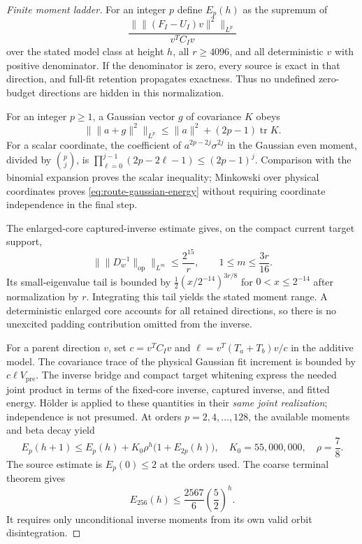 \documentclass[11pt,oneside,openany,a4paper]{report}
\numberwithin{equation}{chapter}
\theoremstyle{definition}
\theoremstyle{remark}
\DeclareMathOperator{\tr}{tr}\DeclareMathOperator{\rank}{rank}
\begin{document}
\begin{proof}[Finite moment ladder]
For an integer $p$ define $E_p(h)$ as the supremum of
\[
 \frac{\|\lVert(F_I-U_I)v\rVert^2\|_{L^p}}{v^TC_Iv}
\]
over the stated model class at height $h$, all $r\geq4096$, and all
deterministic $v$ with positive denominator.  If the denominator is
zero, every source is exact in that direction, and full-fit retention
propagates exactness.  Thus no undefined zero-budget directions are
hidden in this normalization.

For an integer $p\geq1$, a Gaussian vector $g$ of covariance $K$ obeys
\begin{equation}
 \|\lVert a+g\rVert^2\|_{L^p}
 \leq\lVert a\rVert^2+(2p-1)\tr K.
 \label{eq:route-gaussian-energy}
\end{equation}
For a scalar coordinate, the coefficient of
$a^{2p-2j}\sigma^{2j}$ in the Gaussian even moment, divided by
$\binom pj$, is
$\prod_{\ell=0}^{j-1}(2p-2\ell-1)\leq(2p-1)^j$.
Comparison with the binomial expansion proves the scalar inequality;
Minkowski over physical coordinates proves
\eqref{eq:route-gaussian-energy} without requiring coordinate
independence in the final step.

The enlarged-core captured-inverse estimate gives, on the compact
current target support,
\[
 \bigl\|\lVert D_w^{-1}\rVert_{\mathrm{op}}\bigr\|_{L^m}
 \leq\frac{2^{15}}r,
 \qquad1\leq m\leq\frac{3r}{16}.
\]
Its small-eigenvalue tail is bounded by
$\tfrac12(x/2^{-14})^{3r/8}$ for $0<x\leq2^{-14}$ after normalization
by $r$.  Integrating this tail yields the stated moment range.  A
deterministic enlarged core accounts for all retained directions, so
there is no unexcited padding contribution omitted from the inverse.

For a parent direction $v$, set $c=v^TC_Iv$ and
$\ell=v^T(T_a+T_b)v/c$ in the additive model.  The covariance trace of
the physical Gaussian fit increment is bounded by
$c\ell V_{\mathrm{pre}}$.  The inverse bridge and compact target
whitening express the needed joint product in terms of the fixed-core
inverse, captured inverse, and fitted energy.  Hölder is applied to
these quantities in their \emph{same joint realization}; independence
is not presumed.  At orders $p=2,4,\ldots,128$, the available moments
and beta decay yield
\begin{equation}
 E_p(h+1)\leq E_p(h)
       +K_0\rho^h\bigl(1+E_{2p}(h)\bigr),
 \quad K_0=55{,}000{,}000,\quad \rho=\frac78.
 \label{eq:route-moment-ladder}
\end{equation}
The source estimate is $E_p(0)\leq2$ at the orders used.  The coarse
terminal theorem gives
\begin{equation}
 E_{256}(h)\leq\frac{2567}{6}\left(\frac52\right)^h.
 \label{eq:route-terminal}
\end{equation}
It requires only unconditional inverse moments from its own valid
orbit disintegration.


\end{proof}
\end{document}
